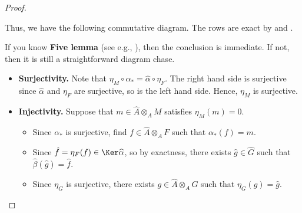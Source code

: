 \begin{proof}
\begin{alphenum}
    Thus, we have the following commutative diagram.
    The rows are exact by 
    and .
    \begin{center}
    \end{center}
    If you know \textbf{Five lemma} (see e.g.,
    \cite[(5.23)]{altman_kleiman}), then the conclusion is immediate.
    If not, then it is still a straightforward diagram chase.
    \begin{itemize}
    \item \textbf{Surjectivity.}
    Note that $\eta_M\circ\alpha_* = \widehat\alpha \circ\eta_F$.
    The right hand side is surjective since 
    $\widehat\alpha$ and $\eta_F$ are surjective,
    so is the left hand side. Hence, $\eta_M$ is surjective.
    \item \textbf{Injectivity.}
    Suppose that $m\in \widehat A\otimes_A M$ 
    satisfies $\eta_M(m) = 0$.
    \begin{center}
    \end{center}
    \begin{itemize}
    \item Since $\alpha_*$ is surjective,
    find $f\in \widehat A\otimes_A F$ 
    such that $\alpha_*(f)=m$. 
    \item Since $\hat f=\eta_F(f)\in\Ker\widehat\alpha$, so by exactness,
    there exists $\hat g\in \widehat G$ such that 
    $\widehat\beta(\hat g) = \hat f$.
    \item Since $\eta_G$ is surjective,
    there exists $g\in \widehat A\otimes_A G$ such that
    $\eta_G(g)=\hat g$.

\end{itemize}
\end{itemize}
\end{alphenum}
\end{proof}
